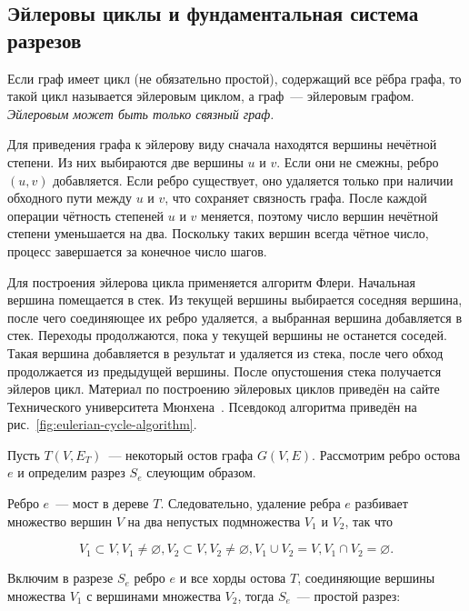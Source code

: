 
\subsection{Эйлеровы циклы и фундаментальная система разрезов}

Если граф имеет цикл (не обязательно простой), содержащий все рёбра графа, то такой цикл называется эйлеровым циклом, а граф~--- эйлеровым графом. \textit{Эйлеровым может быть только связный граф.}

Для приведения графа к эйлерову виду сначала находятся вершины нечётной степени. Из них выбираются две вершины $u$ и $v$. Если они не смежны, ребро $(u,v)$ добавляется. Если ребро существует, оно удаляется только при наличии обходного пути между $u$ и $v$, что сохраняет связность графа. После каждой операции чётность степеней $u$ и $v$ меняется, поэтому число вершин нечётной степени уменьшается на два. Поскольку таких вершин всегда чётное число, процесс завершается за конечное число шагов.

Для построения эйлерова цикла применяется алгоритм Флери. Начальная вершина помещается в стек. Из текущей вершины выбирается соседняя вершина, после чего соединяющее их ребро удаляется, а выбранная вершина добавляется в стек. Переходы продолжаются, пока у текущей вершины не останется соседей. Такая вершина добавляется в результат и удаляется из стека, после чего обход продолжается из предыдущей вершины. После опустошения стека получается эйлеров цикл. Материал по построению эйлеровых циклов приведён на сайте Технического университета Мюнхена~\cite{tum-eulerian-cycle}. Псевдокод алгоритма приведён на рис.~\ref{fig:eulerian-cycle-algorithm}.


Пусть $T(V, E_{T})$~--- некоторый остов графа $G(V, E)$. Рассмотрим ребро остова $e$ и определим разрез $S_{e}$ слеующим образом.

Ребро $e$~--- мост в дереве $T$. Следовательно, удаление ребра $e$ разбивает множество вершин $V$ на два непустых подмножества $V_{1}$ и $V_{2}$, так что

\[
V_1 \subset V, V_1 \neq \varnothing, V_2 \subset V, V_2 \neq \varnothing, V_1 \cup V_2 = V, V_1 \cap V_2 = \varnothing.
\]

Включим в разрезе $S_{e}$ ребро $e$ и все хорды остова $T$, соединяющие вершины множества $V_{1}$ с вершинами множества $V_{2}$, тогда $S_{e}$~--- простой разрез:

